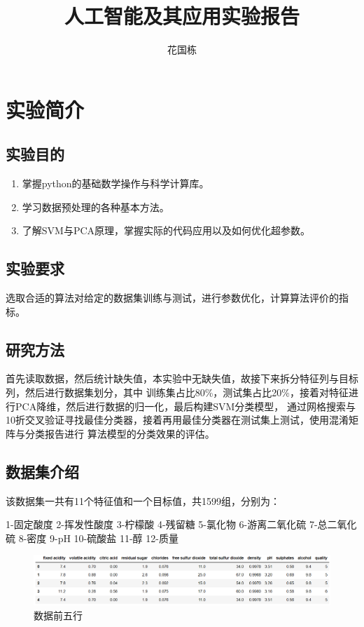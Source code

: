 \documentclass[UTF8]{ctexart}
\title{人工智能及其应用实验报告}
\author{花国栋}
\begin{document}
    \maketitle
    \tableofcontents
    \newpage
    \section{实验简介}
        \subsection{实验目的}
        \begin{enumerate}
            \item 掌握python的基础数学操作与科学计算库。
            \item 学习数据预处理的各种基本方法。
            \item 了解SVM与PCA原理，掌握实际的代码应用以及如何优化超参数。
        \end{enumerate}
        \subsection{实验要求}
        选取合适的算法对给定的数据集训练与测试，进行参数优化，计算算法评价的指标。
        \subsection{研究方法}
        首先读取数据，然后统计缺失值，本实验中无缺失值，故接下来拆分特征列与目标列，然后进行数据集划分，其中
        训练集占比80\%，测试集占比20\%，接着对特征进行PCA降维，然后进行数据的归一化，最后构建SVM分类模型，
        通过网格搜索与10折交叉验证寻找最佳分类器，接着再用最佳分类器在测试集上测试，使用混淆矩阵与分类报告进行
        算法模型的分类效果的评估。
        \subsection{数据集介绍}
        该数据集一共有11个特征值和一个目标值，共1599组，分别为：

        1-固定酸度 2-挥发性酸度 3-柠檬酸 4-残留糖 5-氯化物 6-游离二氧化硫
        7-总二氧化硫 8-密度 9-pH 10-硫酸盐 11-醇 12-质量
        \begin{figure}[htbp]
            \centering
            \includegraphics[scale=0.5]{data_head.png}
            \caption{数据前五行}
            \label{figure1}
        \end{figure}
\end{document}
